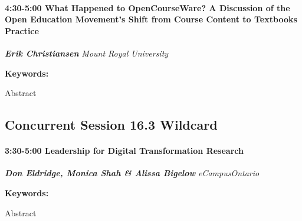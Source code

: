 \documentclass[
]{book}
\begin{document}
\begin{session}
\hypertarget{what-happened-to-opencourseware-a-discussion-of-the-open-education-movements-shift-from-course-content-to-textbooks-practice}{%
\paragraph*{\texorpdfstring{4:30-5:00 \textbar{} \textbf{What Happened
to OpenCourseWare? A Discussion of the Open Education Movement's Shift
from Course Content to Textbooks} \textbar{}
Practice}{4:30-5:00 \textbar{} What Happened to OpenCourseWare? A Discussion of the Open Education Movement's Shift from Course Content to Textbooks \textbar{} Practice}}\label{what-happened-to-opencourseware-a-discussion-of-the-open-education-movements-shift-from-course-content-to-textbooks-practice}}

\textbf{\emph{Erik Christiansen}} \textbar{} \emph{Mount Royal
University}

\textbf{Keywords:}

Abstract
\end{session}

\hypertarget{concurrent-session-16.3-wildcard}{%
\subsection*{Concurrent Session 16.3 \textbar{} Wildcard}\label{concurrent-session-16.3-wildcard}}

\begin{session}
\hypertarget{leadership-for-digital-transformation-research}{%
\paragraph*{\texorpdfstring{3:30-5:00 \textbar{} \textbf{Leadership for
Digital Transformation} \textbar{}
Research}{3:30-5:00 \textbar{} Leadership for Digital Transformation \textbar{} Research}}\label{leadership-for-digital-transformation-research}}

\textbf{\emph{Don Eldridge, Monica Shah \& Alissa Bigelow}} \textbar{}
\emph{eCampusOntario}

\textbf{Keywords:}

Abstract
\end{session}
\end{document}
